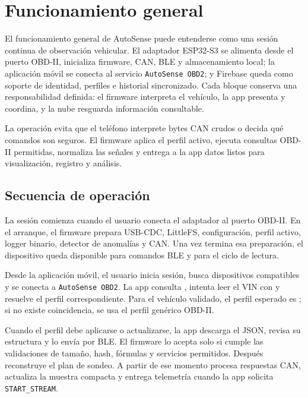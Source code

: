\documentclass[12pt,letterpaper]{report}
\begin{document}
\section{Funcionamiento general}

El funcionamiento general de AutoSense puede entenderse como una sesión continua de observación vehicular. El adaptador ESP32-S3 se alimenta desde el puerto OBD-II, inicializa firmware, CAN, BLE y almacenamiento local; la aplicación móvil se conecta al servicio \texttt{AutoSense OBD2}; y Firebase queda como soporte de identidad, perfiles e historial sincronizado. Cada bloque conserva una responsabilidad definida: el firmware interpreta el vehículo, la app presenta y coordina, y la nube resguarda información consultable.

La operación evita que el teléfono interprete bytes CAN crudos o decida qué comandos son seguros. El firmware aplica el perfil activo, ejecuta consultas OBD-II permitidas, normaliza las señales y entrega a la app datos listos para visualización, registro y análisis.

\subsection{Secuencia de operación}

La sesión comienza cuando el usuario conecta el adaptador al puerto OBD-II. En el arranque, el firmware prepara USB-CDC, LittleFS, configuración, perfil activo, logger binario, detector de anomalías y CAN. Una vez termina esa preparación, el dispositivo queda disponible para comandos BLE y para el ciclo de lectura.

Desde la aplicación móvil, el usuario inicia sesión, busca dispositivos compatibles y se conecta a \texttt{AutoSense OBD2}. La app consulta , intenta leer el VIN con  y resuelve el perfil correspondiente. Para el vehículo validado, el perfil esperado es ; si no existe coincidencia, se usa el perfil genérico OBD-II.

Cuando el perfil debe aplicarse o actualizarse, la app descarga el JSON, revisa su estructura y lo envía por BLE. El firmware lo acepta solo si cumple las validaciones de tamaño, hash, fórmulas y servicios permitidos. Después reconstruye el plan de sondeo. A partir de ese momento procesa respuestas CAN, actualiza la muestra compacta y entrega telemetría cuando la app solicita \texttt{START\_STREAM}.
\end{document}
